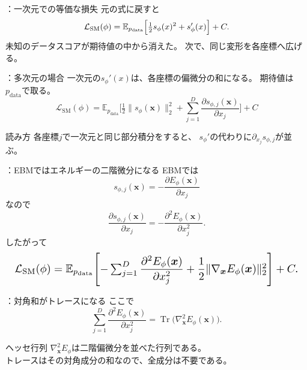 \assuppl
\begin{frame}{\supplmark：一次元での等価な損失}
    元の式に戻すと
    \[
        \mathcal{L}_{\mathrm{SM}}(\phi)
        =
        \mathbb{E}_{p_{\mathrm{data}}}
        \Bigl[
        \tfrac12 s_\phi(x)^2+s_\phi'(x)
        \Bigr]+C.
    \]
    未知のデータスコアが期待値の中から消えた。
    次で、同じ変形を各座標へ広げる。
\end{frame}
\assuppl
\begin{frame}{\supplmark：多次元の場合}
    一次元の$s_\phi'(x)$は、各座標の偏微分の和になる。
    期待値は$p_{\mathrm{data}}$で取る。
    \[
        \mathcal{L}_{\mathrm{SM}}(\phi)
        =
        \mathbb{E}_{p_{\mathrm{data}}}
        \Biggl[
        \tfrac12\|s_\phi(\bm{x})\|_2^2
        +
        \sum_{j=1}^{D}
        \frac{\partial s_{\phi,j}(\bm{x})}{\partial x_j}
        \Biggr]
        +C
    \]
    \begin{exampleblock}{読み方}
        各座標$j$で一次元と同じ部分積分をすると、
        $s_\phi'$の代わりに$\partial_{x_j}s_{\phi,j}$が並ぶ。
    \end{exampleblock}
\end{frame}
\assuppl
\begin{frame}{\supplmark：EBMではエネルギーの二階微分になる}
    EBMでは
    \[
        s_{\phi,j}(\bm{x})
        =
        -\frac{\partial E_\phi(\bm{x})}{\partial x_j}
    \]
    なので
    \[
        \frac{\partial s_{\phi,j}(\bm{x})}{\partial x_j}
        =
        -\frac{\partial^{2}E_\phi(\bm{x})}{\partial x_j^{2}}.
    \]
    したがって
    \[
        \resizebox{0.98\textwidth}{!}{$
        \mathcal{L}_{\mathrm{SM}}(\phi)
        =
        \mathbb{E}_{p_{\mathrm{data}}}
        \Biggl[
        -\sum_{j=1}^{D}
        \dfrac{\partial^{2}E_\phi(\bm{x})}{\partial x_j^{2}}
        +
        \dfrac12\|\nabla_{\bm{x}}E_\phi(\bm{x})\|_2^2
        \Biggr]
        +C.
        $}
    \]
\end{frame}
\assuppl
\begin{frame}{\supplmark：対角和がトレースになる}
    ここで
    \[
        \sum_{j=1}^{D}
        \frac{\partial^{2}E_\phi(\bm{x})}{\partial x_j^{2}}
        =
        \operatorname{Tr}\bigl(\nabla_{\bm{x}}^{2}E_\phi(\bm{x})\bigr).
    \]
    \begin{exampleblock}{ヘッセ行列}
        $\nabla_{\bm{x}}^{2}E_\phi$は二階偏微分を並べた行列である。\\
        トレースはその対角成分の和なので、全成分は不要である。
    \end{exampleblock}
\end{frame}
